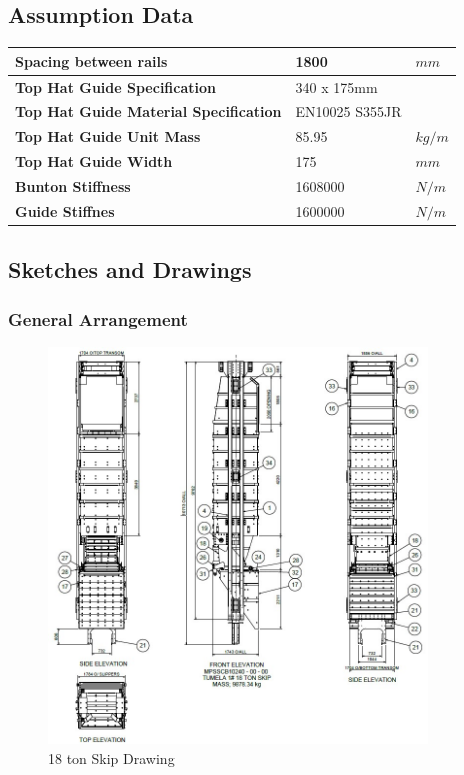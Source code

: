 \documentclass{article}%
\begin{document}
%
\newpage%
\subsection{Assumption Data}%
\label{subsec:AssumptionData}%
\begin{flushleft}%
\begin{minipage}{\textwidth}%
\flushleft%
\begin{tabular}{|l |l |l|}%
\hline%
\textbf{Spacing between rails}&1800&$mm$\\%
\hline%
\textbf{Top Hat Guide Specification}&340 x 175mm&\\%
\hline%
\textbf{Top Hat Guide Material Specification}&EN10025 S355JR&\\%
\hline%
\textbf{Top Hat Guide Unit Mass}&85.95&$kg/m$\\%
\hline%
\textbf{Top Hat Guide Width}&175&$mm$\\%
\hline%
\textbf{Bunton Stiffness}&1608000&$N/m$\\%
\hline%
\textbf{Guide Stiffnes}&1600000&$N/m$\\%
\hline%
\end{tabular}%
\end{minipage}%
\end{flushleft}

%
\newpage%
\subsection{Sketches and Drawings}%
\label{subsec:SketchesandDrawings}%
\subsubsection{General Arrangement}%
\label{ssubsec:GeneralArrangement}%


\begin{figure}[h!]%
\includegraphics[width=380px]{Tumela 18 ton Skip.jpg}%
\centering%
\caption{18 ton Skip Drawing}%
\centering%
\end{figure}
\end{document}
